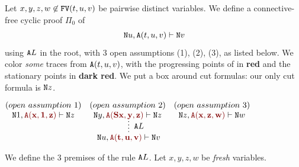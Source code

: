 \documentclass[a4paper,12pt]{article}
\newenvironment{proof}[1][Proof]{\begin{trivlist}
\item[\hskip \labelsep {\bfseries #1}]}{\end{trivlist}}
\newcommand{\Nat}               { {\tt N}  }
\newcommand{\FV}              { {\tt FV} }
\newcommand{\id}              { {\tt id} }
\newcommand{\eq}              { {\tt eq} }
\newcommand{\Ack}   {{\tt A}}
\begin{document}
\newcommand{\redStat}   [1]  { {\color{darkred}\mathbf {#1}} }
\newcommand{\redProg}  [1]  { {\color{red}\mathbf {#1}} }

\newcommand{\blueStat} [1]  { {\color{darkblue}\mathbf {#1}} }
\newcommand{\blueProg}[1]  { {\color{blue}\mathbf {#1}} }

\begin{proof}
Let $x,y,z,w\not \in \FV(t,u,v)$ be pairwise distinct variables. We define a connective-free 
cyclic proof $\Pi_0$ of $$\Nat u, \Ack(t,u,v) \vdash \Nat v$$ using $\Ack L$ in the root, with 
$3$ open assumptions (1), (2), (3), as listed below. 
We color \emph{some} traces from $\Ack(t,u,v)$, with the progressing points of 
in {\bf \color{red}red} and the stationary points in {\bf \color{darkred}dark red}.
We put a box around cut formulas: our only cut formula is $\Nat z$. 

\begin{center}
$\infer*[\Ack L] %
 {\Nat u, {\redStat{\Ack(t,u,v)}} \vdash \Nat v}
 {\deduce{\Nat 1, {\redStat{\Ack(x,1,z)}}   \vdash \Nat z} {(open \ assumption \ 1)} & 
   \deduce{\Nat y, {\redStat{\Ack(Sx,y,z)}} \vdash \Nat z} {(open \ assumption \ 2)} &
   \deduce{\Nat z, {\redStat{\Ack(x,z,w)}}  \vdash \Nat w}{(open \ assumption \ 3)}
 }
$
\end{center}

We define the $3$ premises of the rule $\Ack L$. Let $x,y,z,w$ be \emph{fresh}
variables. %

\newcommand{\firstPremiseAckL}
{{ 
   \infer[\eq]
              {\Nat u, t\!=\!0, u\!=\!y, v\!=\!Sy \vdash \Nat v} 
              {\infer[\Nat R]{\Nat y \vdash \Nat Sy}
                         {\deduce{\Nat y \vdash \Nat y}
                                        {\id}
                         } 
              }
}}

\newcommand{\secondPremiseAckL}
{{
   \infer[\eq]
            {\Nat u, t\!=\!x, u\!=\!1, v\!=\!z, {\redProg{\Ack(x,1,z)}} \vdash \Nat v} 
            {\deduce{\Nat 1, {\redStat{\Ack(x,1,z)}} \vdash \Nat z}
                          {(open \ assumption \ 1)}
             }
}}

\newcommand{\thirdPremiseAckL}
{{
\infer[\eq]
   {\Nat u, t\!=\!Sx, u\!=\!y, v\!=\!w, 
                  {\redProg{\Ack(Sx,y,z)}}, 
                  {\redProg{\Ack(x,z,w)}} \vdash \Nat v}
   {\infer[\tt cut]
     {\Nat y,  {\redStat{\Ack(Sx,y,z)}}, 
                   {\redStat{\Ack(x,z,w)}} \vdash \Nat w}
     {
        \deduce{\Nat y, {\redStat{\Ack(Sx,y,z)}} 
                       \vdash 
                       \boxed{ \color{darkgreen}\mathbf{\Nat z} }} 
                    {(open \ assumption \ 2)} 
     &
       \deduce{\boxed{ \color{darkgreen}\mathbf{\Nat z}}, {\redStat{\Ack(x,z,w)}}  
                     \vdash 
                     \Nat w}
                   {(open \ assumption \ 3)}
     }
   }
}}


\end{proof}
\end{document}
